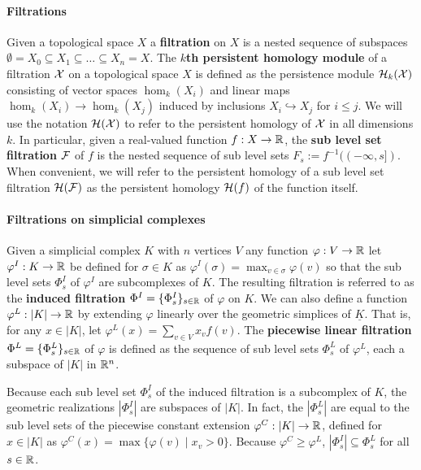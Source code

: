 
\paragraph{Filtrations}

Given a topological space $X$ a \textbf{filtration} on $X$ is a nested sequence of subspaces $\emptyset= X_0\subseteq X_1\subseteq\ldots \subseteq X_n = X$.
The \textbf{$k$th persistent homology module} of a filtration $\mathcal{X}$ on a topological space $X$ is defined as the persistence module $\mathcal{H}_k(\mathcal{X})$ consisting of vector spaces $\hom_k(X_i)$ and linear maps $\hom_k(X_i)\to\hom_k(X_j)$ induced by inclusions $X_i\hookrightarrow X_j$ for $i\leq j$.
We will use the notation $\mathcal{H}(\mathcal{X})$ to refer to the persistent homology of $\mathcal{X}$ in all dimensions $k$.
In particular, given a real-valued function $f: X\to\mathbb{R}$, the \textbf{sub level set filtration} $\mathcal{F}$ of $f$ is the nested sequence of sub level sets $F_s := f^{-1}((-\infty,s])$.
When convenient, we will refer to the persistent homology of a sub level set filtration $\mathcal{H}(\mathcal{F})$ as the persistent homology $\mathcal{H}(f)$ of the function itself.

\paragraph{Filtrations on simplicial complexes}

Given a simplicial complex $K$ with $n$ vertices $V$ any function $\varphi : V\to\mathbb{R}$ let $\varphi^I : K\to\mathbb{R}$ be defined for $\sigma\in K$ as $\varphi^I(\sigma) = \max_{v\in\sigma} \varphi(v)$ so that the sub level sets $\Phi^I_s$ of $\varphi^I$ are subcomplexes of $K$.
The resulting filtration is referred to as the \textbf{induced filtration} $\Phi^I = \{\Phi^I_s\}_{s\in\mathbb{R}}$ of $\varphi$ on $K$.
We can also define a function $\varphi^L : |K|\to\mathbb{R}$ by extending $\varphi$ linearly over the geometric simplices of $\underline{K}$.
That is, for any $x \in |K|$, let $\varphi^L(x) = \sum_{v\in V} x_v f(v)$.
The \textbf{piecewise linear filtration} $\Phi^L = \{\Phi^L_s\}_{s\in\mathbb{R}}$ of $\varphi$ is defined as the sequence of sub level sets $\Phi^L_s$ of $\varphi^L$, each a subspace of $|K|$ in $\mathbb{R}^n$.

Because each sub level set $\Phi_s^I$ of the induced filtration is a subcomplex of $K$, the geometric realizations $|\Phi_s^I|$ are subspaces of $|K|$.
In fact, the $|\Phi_s^L|$ are equal to the sub level sets of the piecewise constant extension $\varphi^C : |K|\to \mathbb{R}$, defined for $x\in |K|$ as $\varphi^C(x) = \max\{\varphi(v)\mid x_v > 0\}$.
Because $\varphi^C \geq \varphi^L$, $|\Phi_s^I|\subseteq \Phi_s^L$ for all $s\in\mathbb{R}$.

